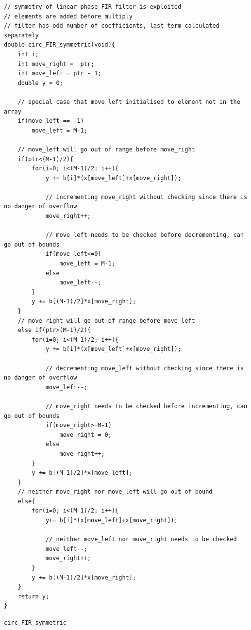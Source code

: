 \documentclass{article}
\begin{document}
\begin{listing}[H]
\begin{verbatim}
// symmetry of linear phase FIR filter is exploited
// elements are added before multiply
// filter has odd number of coefficients, last term calculated separately
double circ_FIR_symmetric(void){
    int i;
    int move_right =  ptr;			
    int move_left = ptr - 1;			
    double y = 0;				
    
    // special case that move_left initialised to element not in the array				
    if(move_left == -1)				
        move_left = M-1;			
    
    // move_left will go out of range before move_right 
    if(ptr<(M-1)/2){
        for(i=0; i<(M-1)/2; i++){	
            y += b[i]*(x[move_left]+x[move_right]);	
            
            // incrementing move_right without checking since there is no danger of overflow
            move_right++;
            
            // move_left needs to be checked before decrementing, can go out of bounds
            if(move_left<=0)		
                move_left = M-1;	
            else		
                move_left--;	
        }		
        y += b[(M-1)/2]*x[move_right];			
    }
    // move_right will go out of range before move_left
    else if(ptr>(M-1)/2){
        for(i=0; i<(M-1)/2; i++){
            y += b[i]*(x[move_left]+x[move_right]);		
            
            // decrementing move_left without checking since there is no danger of overflow
            move_left--;
            
            // move_right needs to be checked before incrementing, can go out of bounds
            if(move_right>=M-1)		
                move_right = 0;	
            else		
                move_right++;	
        }
        y += b[(M-1)/2]*x[move_left];			
    }
    // neither move_right nor move_left will go out of bound
    else{
        for(i=0; i<(M-1)/2; i++){
            y+= b[i]*(x[move_left]+x[move_right]);		
        
            // neither move_left nor move_right needs to be checked
            move_left--;		
            move_right++;		
        }
        y += b[(M-1)/2]*x[move_right];			
    }
    return y;
}
\end{verbatim}
\caption{{\tt circ\_FIR\_symmetric}}
\label{lst:circ_FIR_symmetric}
\end{listing}
\end{document}
